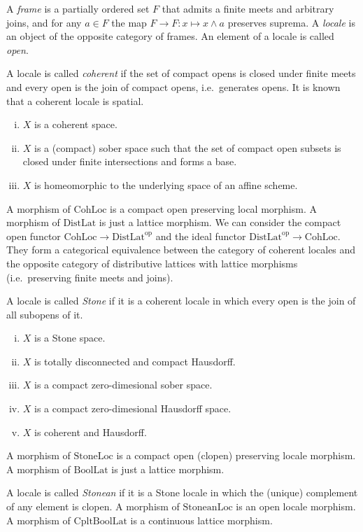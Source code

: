\documentclass{../../large}
\begin{document}
A \emph{frame} is a partially ordered set $F$ that admits a finite meets and arbitrary joins, and for any $a\in F$ the map $F\to F:x\mapsto x\wedge a$ preserves suprema.
A \emph{locale} is an object of the opposite category of frames.
An element of a locale is called \emph{open}.


A locale is called \emph{coherent} if the set of compact opens is closed under finite meets and every open is the join of compact opens, i.e.~generates opens.
It is known that a coherent locale is spatial.
\begin{enumerate}[(i)]
\item $X$ is a coherent space.
\item $X$ is a (compact) sober space such that the set of compact open subsets is closed under finite intersections and forms a base.
\item $X$ is homeomorphic to the underlying space of an affine scheme.
\end{enumerate}
A morphism of $\mathrm{CohLoc}$ is a compact open preserving local morphism.
A morphism of $\mathrm{DistLat}$ is just a lattice morphism.
We can consider the compact open functor $\mathrm{CohLoc}\to\mathrm{DistLat}^{\mathrm{op}}$ and the ideal functor $\mathrm{DistLat}^{\mathrm{op}}\to\mathrm{CohLoc}$.
They form a categorical equivalence between the category of coherent locales and the opposite category of distributive lattices with lattice morphisms (i.e.~preserving finite meets and joins).

A locale is called \emph{Stone} if it is a coherent locale in which every open is the join of all subopens of it.
\begin{enumerate}[(i)]
\item $X$ is a Stone space.
\item $X$ is totally disconnected and compact Hausdorff.
\item $X$ is a compact zero-dimesional sober space.
\item $X$ is a compact zero-dimesional Hausdorff space.
\item $X$ is coherent and Hausdorff.
\end{enumerate}
A morphism of $\mathrm{StoneLoc}$ is a compact open (clopen) preserving locale morphism.
A morphism of $\mathrm{BoolLat}$ is just a lattice morphism.





A locale is called \emph{Stonean} if it is a Stone locale in which the (unique) complement of any element is clopen.
A morphism of $\mathrm{StoneanLoc}$ is an open locale morphism.
A morphism of $\mathrm{CpltBoolLat}$ is a continuous lattice morphism.
\end{document}
